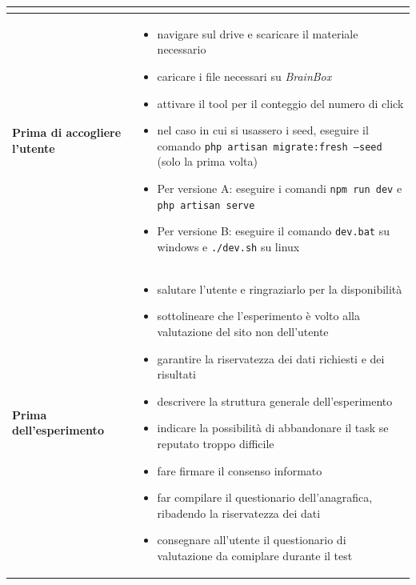 \begin{table}[H]
  \centering
  \small
  \renewcommand{\arraystretch}{1.2}
  \begin{tabularx}{\textwidth}{|>{\raggedright\bfseries\arraybackslash}p{3.5cm}|>{\raggedright\arraybackslash}X|}
    \hline
    \rowcolor{gray!30}
    \multicolumn{2}{|c|}{\textbf{CHECKLIST}} \\
    \hline
    Prima di accogliere l'utente &
    \vspace{-8pt}
    \begin{itemize}[itemsep=2pt, topsep=2pt, parsep=0pt]
        \item navigare sul drive e scaricare il materiale necessario
        \item caricare i file necessari su \textit{BrainBox}
        \item attivare il tool per il conteggio del numero di click
        \item nel caso in cui si usassero i seed, eseguire il comando \texttt{php artisan migrate:fresh --seed} (solo la prima volta)
        \item Per versione A: eseguire i comandi \texttt{npm run dev} e \texttt{php artisan serve}
        \item Per versione B: eseguire il comando \texttt{dev.bat} su windows e \texttt{./dev.sh} su linux
    \end{itemize}
    \vspace{-6pt} \\
    \hline
    Prima dell'esperimento &
    \vspace{-8pt}
    \begin{itemize}[itemsep=2pt, topsep=2pt, parsep=0pt]
        \item salutare l'utente e ringraziarlo per la disponibilità
        \item sottolineare che l'esperimento è volto alla valutazione del sito non dell'utente
        \item garantire la riservatezza dei dati richiesti e dei risultati
        \item descrivere la struttura generale dell'esperimento
        \item indicare la possibilità di abbandonare il task se reputato troppo difficile
        \item fare firmare il consenso informato
        \item far compilare il questionario dell'anagrafica, ribadendo la riservatezza dei dati
        \item consegnare all'utente il questionario di valutazione da comiplare durante il test

\end{itemize}
\end{tabularx}
\end{table}
